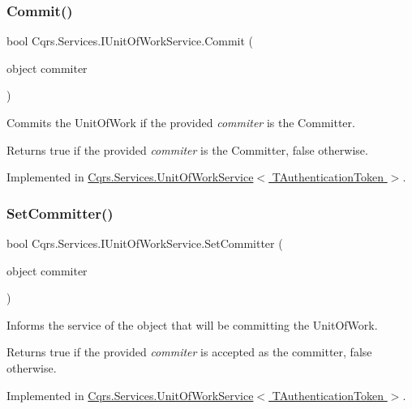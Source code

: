 \subsubsection{\texorpdfstring{Commit()}{Commit()}}
{\footnotesize\ttfamily bool Cqrs.\+Services.\+I\+Unit\+Of\+Work\+Service.\+Commit (\begin{DoxyParamCaption}\item[{object}]{commiter }\end{DoxyParamCaption})}



Commits the Unit\+Of\+Work if the provided {\itshape commiter}  is the Committer. 

\begin{DoxyReturn}{Returns}
true if the provided {\itshape commiter}  is the Committer, false otherwise. 
\end{DoxyReturn}


Implemented in \hyperlink{classCqrs_1_1Services_1_1UnitOfWorkService_a3291740821150ecea174820ed27ee56c_a3291740821150ecea174820ed27ee56c}{Cqrs.\+Services.\+Unit\+Of\+Work\+Service$<$ T\+Authentication\+Token $>$}.

\mbox{\label{interfaceCqrs_1_1Services_1_1IUnitOfWorkService_a54f241cd90bbebf9cc73d5a296ed593b_a54f241cd90bbebf9cc73d5a296ed593b}} 
\subsubsection{\texorpdfstring{Set\+Committer()}{SetCommitter()}}
{\footnotesize\ttfamily bool Cqrs.\+Services.\+I\+Unit\+Of\+Work\+Service.\+Set\+Committer (\begin{DoxyParamCaption}\item[{object}]{commiter }\end{DoxyParamCaption})}



Informs the service of the object that will be committing the Unit\+Of\+Work. 

\begin{DoxyReturn}{Returns}
true if the provided {\itshape commiter}  is accepted as the committer, false otherwise. 
\end{DoxyReturn}


Implemented in \hyperlink{classCqrs_1_1Services_1_1UnitOfWorkService_a663471bc62f79df22c800ad683a27f59_a663471bc62f79df22c800ad683a27f59}{Cqrs.\+Services.\+Unit\+Of\+Work\+Service$<$ T\+Authentication\+Token $>$}.

